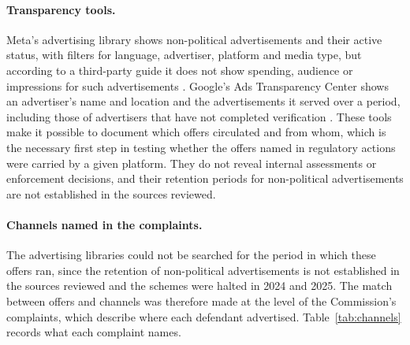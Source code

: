 \documentclass[12pt, a4paper]{article}
\begin{document}
\paragraph{Transparency tools.} Meta's advertising library shows non-political advertisements and their active status, with filters for language, advertiser, platform and media type, but according to a third-party guide it does not show spending, audience or impressions for such advertisements \citep{Loomer}. Google's Ads Transparency Center shows an advertiser's name and location and the advertisements it served over a period, including those of advertisers that have not completed verification \citep{GoogleATC}. These tools make it possible to document which offers circulated and from whom, which is the necessary first step in testing whether the offers named in regulatory actions were carried by a given platform. They do not reveal internal assessments or enforcement decisions, and their retention periods for non-political advertisements are not established in the sources reviewed.

\paragraph{Channels named in the complaints.} The advertising libraries could not be searched for the period in which these offers ran, since the retention of non-political advertisements is not established in the sources reviewed and the schemes were halted in 2024 and 2025. The match between offers and channels was therefore made at the level of the Commission's complaints, which describe where each defendant advertised. Table~\ref{tab:channels} records what each complaint names.
\end{document}
